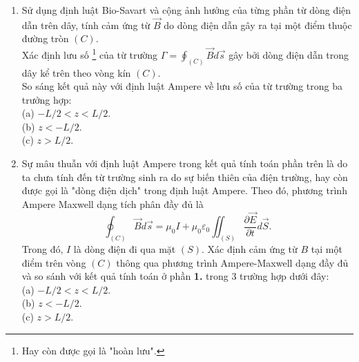 \begin{enumerate}
    \item Sử dụng định luật Bio-Savart và cộng ảnh hưởng của từng phần từ dòng điện dẫn trên dây, tính cảm ứng từ $\Vec{B}$ do dòng điện dẫn gây ra tại một điểm thuộc đường tròn $(C)$. \\
    Xác định lưu số \footnote{Hay còn được gọi là "hoàn lưu".} của từ trường $\Gamma=\oint_{(C)} \Vec{B} d \Vec{s}$ gây bởi dòng điện dẫn trong dây kể trên theo vòng kín $(C)$. \\
    So sáng kết quả này với định luật Ampere về lưu số của từ trường trong ba trưởng hợp: \\
    (a) $-L/2<z<L/2$. \\
    (b) $z<-L/2$. \\
    (c) $z>L/2$.
    \item Sự mâu thuẫn với định luật Ampere trong kết quả tính toán phần trên là do ta chưa tính đến từ trường sinh ra do sự biến thiên của điện trường, hay còn được gọi là "dòng điện dịch" trong định luật Ampere. Theo đó, phương trình Ampere Maxwell dạng tích phân đầy đủ là 
    $$\oint_{(C)} \Vec{B} d \Vec{s} = \mu_0 I + \mu_0 \varepsilon_0 \iint_{(S)} \dfrac{\partial \Vec{E}}{\partial t} d \Vec{S}.$$
    Trong đó, $I$ là dòng điện đi qua mặt $(S)$. Xác định cảm ứng từ $B$ tại một điểm trên vòng $(C)$ thông qua phương trình Ampere-Maxwell dạng đầy đủ và so sánh với kết quả tính toán ở phần \textbf{1.} trong 3 trường hợp dưới đây: \\
    (a) $-L/2<z<L/2$. \\
    (b) $z<-L/2$. \\
    (c) $z>L/2$.
\end{enumerate}